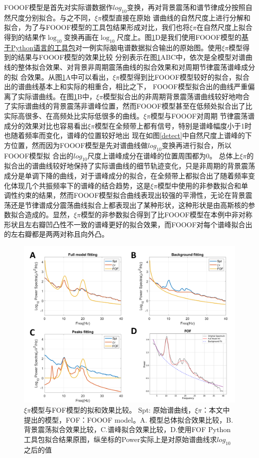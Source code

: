 FOOOF模型是首先对实际谱数据作$log_{10}$变换，再对背景震荡和谱节律成分按照自然尺度分别拟合。与之不同，$\xi\pi$模型直接在原始
谱曲线的自然尺度上进行分解和拟合，为了与FOOOF模型的工具包结果形成对比，我们也将$\xi\pi$在自然尺度上拟合得到的结果作$\log_{10}$变换再画在$\log_{10}$尺度上。图\ref{comp}D是我们使用FOOOF模型的\href{https://github.com/fooof-tools/fooof/tree/master/fooof}{基于Python语言的工具包}对一例实际脑电谱数据拟合输出的原始图。使用$\xi\pi$模型得到的结果与FOOOF模型的效果比较
分别表示在图\ref{comp}ABC中，依次是全模型对谱曲线的整体拟合效果、对背景非周期震荡曲线的拟合效果和对周期节律震荡谱峰成分的拟
合效果。从图\ref{comp}A中可以看出，$\xi\pi$模型得到比FOOOF模型较好的拟合，拟合出的谱曲线基本上和实际的相重合，相比之下，
FOOOF模型拟合出的曲线严重偏离了实际谱曲线。在图\ref{comp}B中，$\xi\pi$模型拟合出的非周期背景震荡谱曲线较好地吻合了实际谱曲线的背景震荡非谱峰位置，然而FOOOF模型甚至在低频处拟合出了比实际高很多、在高频处比实际低很多的曲线。$\xi\pi$模型与FOOOF对周期
节律震荡谱成分的效果对比也容易看出$\xi\pi$模型在全频带上都有信号，特别是谱峰幅度小于1时也随着频率而变化，谱峰的位置较好地出
现在如图\ref{detect}中自然尺度上谱峰的下方位置，然而因为FOOOF模型是先对谱曲线做$log_{10}$变换再进行拟合，所以FOOOF模型拟
合出的$log_{10}$尺度上谱峰成分在谱峰的位置周围都为0。 总体上$\xi\pi$的拟合出的谱曲线较好地保持了实际谱曲线的细节轨迹变化，只是非周期的背景震荡成分是单调下降的曲线，对于谱峰成分的拟合，在全频带上都拟合出了随着频率变化体现几个共振频率下的谱峰的结合趋势，这是$\xi\pi$模型中使用的非参数拟合和单调性约束的结果，然而FOOOF模型拟合曲线表现出较强的平滑性，无论在背景震荡还是节律谱成分震荡曲线拟合上都表现出了某种形状，这种形状是由高斯核的参数拟合造成的。显然，$\xi\pi$模型的非参数拟合得到了比FOOOF模型在本例中非对称形状且左右瓣凹凸性不一致的谱峰更好的拟合效果，而FOOOF对每个谱峰拟合出的左右瓣都是两两对称且向外凸。
\begin{figure}
	\includegraphics[width=15cm]{pic/xipi/comp.png}
	\caption{$\xi\pi$模型与FOF模型的拟和效果比较。 Spt: 原始谱曲线，$\xi\pi$：本文中提出的模型，FOF：FOOOF model。A. 模型总体拟合效果比较，B.背景震荡拟合效果比较，C.谱峰拟合效果比较，D.使用FOF Python工具包拟合结果原图，纵坐标的Power实际上是对原始谱曲线求$log_{10}$之后的值}
	\label{comp}
\end{figure}

